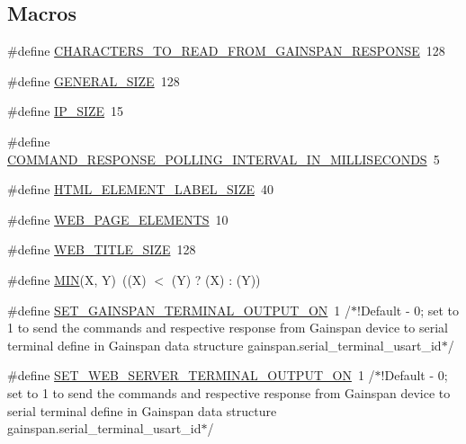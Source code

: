 \subsection*{Macros}
\begin{DoxyCompactItemize}
\item 
\#define \hyperlink{group__wireless__interface_gaf9f3a72bce0008c7561ac323435290ba}{C\+H\+A\+R\+A\+C\+T\+E\+R\+S\+\_\+\+T\+O\+\_\+\+R\+E\+A\+D\+\_\+\+F\+R\+O\+M\+\_\+\+G\+A\+I\+N\+S\+P\+A\+N\+\_\+\+R\+E\+S\+P\+O\+N\+SE}~128
\item 
\#define \hyperlink{group__wireless__interface_ga3285f9ce31e51e5eeb6139ca24bf2de5}{G\+E\+N\+E\+R\+A\+L\+\_\+\+S\+I\+ZE}~128
\item 
\#define \hyperlink{group__wireless__interface_ga2b0b8b640f7863e341022226a4084ad9}{I\+P\+\_\+\+S\+I\+ZE}~15
\item 
\#define \hyperlink{group__wireless__interface_ga4a42661e54e8122b4a77374f16a38eed}{C\+O\+M\+M\+A\+N\+D\+\_\+\+R\+E\+S\+P\+O\+N\+S\+E\+\_\+\+P\+O\+L\+L\+I\+N\+G\+\_\+\+I\+N\+T\+E\+R\+V\+A\+L\+\_\+\+I\+N\+\_\+\+M\+I\+L\+L\+I\+S\+E\+C\+O\+N\+DS}~5
\item 
\#define \hyperlink{group__wireless__interface_gaaabb444506930863d212ea03bf0b31d0}{H\+T\+M\+L\+\_\+\+E\+L\+E\+M\+E\+N\+T\+\_\+\+L\+A\+B\+E\+L\+\_\+\+S\+I\+ZE}~40
\item 
\#define \hyperlink{group__wireless__interface_ga494d4bc8995ae2fde8093a5e0f3c3936}{W\+E\+B\+\_\+\+P\+A\+G\+E\+\_\+\+E\+L\+E\+M\+E\+N\+TS}~10
\item 
\#define \hyperlink{group__wireless__interface_gaa4b9b2c3a0037685aa27d2cf3201dc4d}{W\+E\+B\+\_\+\+T\+I\+T\+L\+E\+\_\+\+S\+I\+ZE}~128
\item 
\#define \hyperlink{group__wireless__interface_gad2f3678bf5eae3684fc497130b946eae}{M\+IN}(X,  Y)~((X) $<$ (Y) ? (X) \+: (Y))
\item 
\#define \hyperlink{group__wireless__interface_ga07aade2ab833478a4196ac92795c5795}{S\+E\+T\+\_\+\+G\+A\+I\+N\+S\+P\+A\+N\+\_\+\+T\+E\+R\+M\+I\+N\+A\+L\+\_\+\+O\+U\+T\+P\+U\+T\+\_\+\+ON}~1				/$\ast$!Default -\/ 0; set to 1 to send the commands and respective response from Gainspan device to serial terminal define in Gainspan data structure gainspan.\+serial\+\_\+terminal\+\_\+usart\+\_\+id$\ast$/
\item 
\#define \hyperlink{group__wireless__interface_gad4025f2e762d2d7957a3c511ce1b0205}{S\+E\+T\+\_\+\+W\+E\+B\+\_\+\+S\+E\+R\+V\+E\+R\+\_\+\+T\+E\+R\+M\+I\+N\+A\+L\+\_\+\+O\+U\+T\+P\+U\+T\+\_\+\+ON}~1				/$\ast$!Default -\/ 0; set to 1 to send the commands and respective response from Gainspan device to serial terminal define in Gainspan data structure gainspan.\+serial\+\_\+terminal\+\_\+usart\+\_\+id$\ast$/

\end{DoxyCompactItemize}
